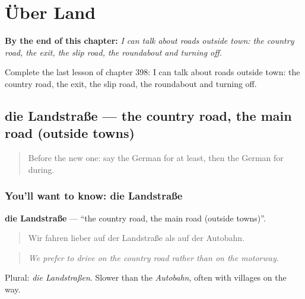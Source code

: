
\chapter{Über Land}
\label{ch:ge-uber-land}

\begin{chapteropening}
\textbf{By the end of this chapter:} \emph{I can talk about roads outside town: the country road, the exit, the slip road, the roundabout and turning off.}

Complete the last lesson of chapter 398: I can talk about roads outside town: the country road, the exit, the slip road, the roundabout and turning off.
\end{chapteropening}

\section[die Landstraße]{die Landstraße — the country road, the main road (outside towns)}

\label{lesson:GE-C398-landstrasse}



\begin{quote}
Before the new one: say the German for at least, then the German for during.
\end{quote}

\subsection*{You'll want to know: die Landstraße}
\textbf{die Landstraße} — \textquotedblleft{}the country road, the main road (outside towns)\textquotedblright{}.

\begin{quote}
Wir fahren lieber auf der Landstraße als auf der Autobahn.
\end{quote}

\begin{quote}
\emph{We prefer to drive on the country road rather than on the motorway.}
\end{quote}

Plural: \emph{die Landstraßen}. Slower than the \emph{Autobahn}, often with villages on the way.

